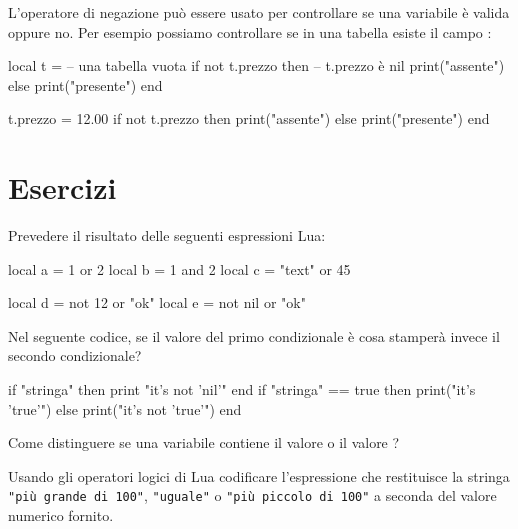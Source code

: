 L'operatore di negazione può essere usato per controllare se una variabile è
valida oppure no. Per esempio possiamo controllare se in una tabella esiste il
campo :
\begin{lines}
local t = {} -- una tabella vuota
if not t.prezzo then -- t.prezzo è nil
    print("assente")
else
    print("presente")
end

t.prezzo = 12.00
if not t.prezzo then
    print("assente")
else
    print("presente")
end
\end{lines}


\section{Esercizi}

\begin{Exercise}[label=oplogic-01]
Prevedere il risultato delle seguenti espressioni Lua:
\begin{lines}
local a = 1 or 2
local b = 1 and 2
local c = "text" or 45

local d = not 12 or "ok"
local e = not nil or "ok"
\end{lines}
\end{Exercise}

\begin{Exercise}[label=oplogic-02]
Nel seguente codice, se il valore del primo condizionale è  cosa
stamperà invece il secondo condizionale?
\begin{lines}
if "stringa" then print "it's not 'nil'" end
if "stringa" == true then
    print("it's 'true'")
else
    print("it's not 'true'")
end
\end{lines}
\end{Exercise}

\begin{Exercise}[label=oplogic-03]
Come distinguere se una variabile contiene il valore  o il valore
?  
\end{Exercise}

\begin{Exercise}[label=oplogic-04]
Usando gli operatori logici di Lua codificare l'espressione che restituisce la
stringa \verb|"più grande di 100"|, \verb|"uguale"| o
\verb|"più piccolo di 100"| a seconda del valore numerico fornito.
\end{Exercise}

